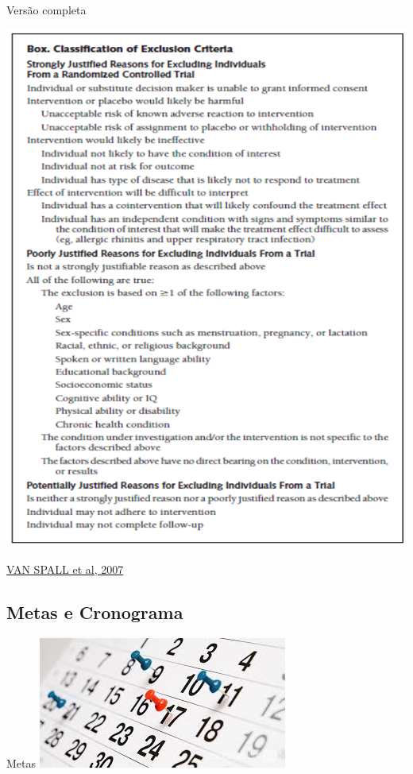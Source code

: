 \documentclass{beamer}
\begin{document}
\begin{frame}{Versão completa}
  \begin{center}
    \includegraphics[height=.9\textheight]{Etapas/box-crit-exclusao}
  \end{center}

  \vfill
  \scriptsize
  \hfill \href{https://doi.org/10.1001/jama.297.11.1233}{VAN SPALL et al, 2007}
\end{frame}

\subsection{Metas e Cronograma}

\begin{frame}{Metas}
  \includegraphics[width=\textwidth]{Etapas/metas}
\end{frame}
\end{document}
